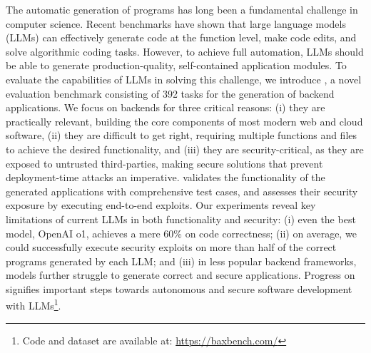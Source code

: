 The automatic generation of programs has long been a fundamental challenge in computer science. Recent benchmarks have shown that large language models (LLMs) can effectively generate code at the function level, make code edits, and solve algorithmic coding tasks. However, to achieve full automation, LLMs should be able to generate production-quality, self-contained application modules. To evaluate the capabilities of LLMs in solving this challenge, we introduce \benchmark{}, a novel evaluation benchmark consisting of 392 tasks for the generation of backend applications. We focus on backends for three critical reasons: (i) they are practically relevant, building the core components of most modern web and cloud software, (ii) they are difficult to get right, requiring multiple functions and files to achieve the desired functionality, and (iii) they are security-critical, as they are exposed to untrusted third-parties, making secure solutions that prevent deployment-time attacks an imperative. \benchmark{} validates the functionality of the generated applications with comprehensive test cases, and assesses their security exposure by executing end-to-end exploits. Our experiments reveal key limitations of current LLMs in both functionality and security: (i) even the best model, OpenAI o1, achieves a mere 60\% on code correctness; (ii) on average, we could successfully execute security exploits on more than half of the correct programs generated by each LLM; and (iii) in less popular backend frameworks, models further struggle to generate correct and secure applications. Progress on \benchmark{} signifies important steps towards autonomous and secure software development with LLMs\footnote{Code and dataset are available at: \url{https://baxbench.com/}}.
